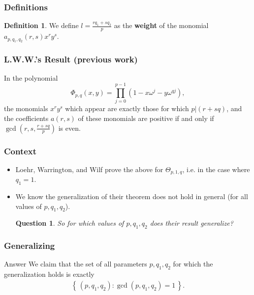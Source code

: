 \documentclass{beamer}
\theoremstyle{plain}
\newtheorem{question}[theorem]{Question}
\theoremstyle{definition}
\newtheorem{Def}[theorem]{Definition}
\theoremstyle{remark}
\newcommand{\bee}{\begin{equation}\begin{aligned}}
\newcommand{\eee}{\end{aligned}\end{equation}}
\renewcommand{\'}{\hspace{0.5mm}'}		%
\renewcommand{\Set}[1]{\left\{\,#1\,\right\}}	%
\begin{document}

\begin{frame}
\frametitle{Definitions}


\begin{Def}
	We define $l = \frac{rq_1 + sq_2}{p}$ as the \textbf{weight} of 	the monomial $a_{p,q_1,q_2}(r,s)x^ry^s$. 
\end{Def}

\end{frame}


\begin{frame}
\frametitle{L.W.W.'s Result (previous work)}


\begin{theorem}
In the polynomial
\[\Phi_{p,q}(x,y) = \prod_{j = 0}^{p - 1}(1 - x\omega^{j} - y\omega^{q j}),\]
the monomials $x^ry^s$ which appear are exactly those for which $p|(r + sq)$, and the coefficients $a(r,s)$ of these monomials are positive if and only if $\gcd \left(r,s,\frac{r + sq}{p}\right)$
 is even. 
\end{theorem}

\end{frame}


\begin{frame}
\frametitle{Context}

\begin{itemize}
	\item Loehr, Warrington, and Wilf prove the above for
	$\Theta_{p,1,q}$, i.e. in the case where $q_1 = 1$.  
	\item We know the generalization of their theorem does not
	hold in general (for all values of $p,q_1,q_2$). 

	
	\begin{question}
	So for which values of $p,q_1,q_2$ does 
	their result generalize?
	\end{question}

\end{itemize}

\end{frame}


\begin{frame}
\frametitle{Generalizing \cite{Loehr2004}}

\begin{block}{Answer}
	We claim that the set of all parameters $p,q_1,q_2$ for
	which the generalization holds is exactly
	\bee
		\Set{(p,q_1,q_2): \gcd(p,q_1,q_2) = 1}. 
	\eee
\end{block}

\end{frame}
\end{document}
